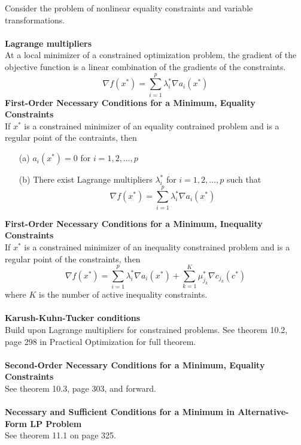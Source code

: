 \documentclass[12pt,a4paper]{report}
\begin{document}
Consider the problem of nonlinear equality constraints and variable transformations.
\\\\
\textbf{Lagrange multipliers}\\
At a local minimizer of a constrained optimization problem, the gradient of the objective function is a linear combination of the gradients of the constraints.
\begin{equation}
\nabla f(x^*)=\sum_{i=1}^p\lambda_i^*\nabla a_i(x^*)
\end{equation}
\textbf{First-Order Necessary Conditions for a Minimum, Equality Constraints}\\
If $x^*$ is a constrained minimizer of an equality contrained problem and is a regular point of the contraints, then
\begin{itemize}
\item[(a)] $a_i(x^*)=0$ for $i=1,2,\ldots,p$
\item[(b)] There exist Lagrange multipliers $\lambda_i^*$ for $i=1,2,\ldots,p$ such that
\begin{equation}
\nabla f(x^*)=\sum_{i=1}^p\lambda_i^*\nabla a_i(x^*)
\end{equation}
\end{itemize}
\textbf{First-Order Necessary Conditions for a Minimum, Inequality Constraints}\\
If $x^*$ is a constrained minimizer of an inequality constrained problem and is a regular point of the constraints, then
\begin{equation}
\nabla f(x^*)=\sum_{i=1}^p\lambda_i^*\nabla a_i(x^*)+\sum_{k=1}^K\mu_{j_k}^*\nabla c_{j_k}(c^*)
\end{equation}
where $K$ is the number of active inequality constraints.\\\\
\textbf{Karush-Kuhn-Tucker conditions}\\
Build upon Lagrange multipliers for constrained problems. See theorem 10.2, page 298 in Practical Optimization for full theorem.\\\\
\textbf{Second-Order Necessary Conditions for a Minimum, Equality Constraints}\\
See theorem 10.3, page 303, and forward.\\\\
\textbf{Necessary and Sufficient Conditions for a Minimum in Alternative-Form LP Problem}\\
See theorem 11.1 on page 325.
\clearpage
\end{document}

